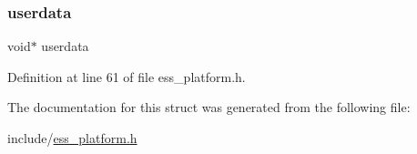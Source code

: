 \subsubsection{\texorpdfstring{userdata}{userdata}}
{\footnotesize\ttfamily void$\ast$ userdata}



Definition at line 61 of file ess\+\_\+platform.\+h.



The documentation for this struct was generated from the following file\+:\begin{DoxyCompactItemize}
\item 
include/\hyperlink{ess__platform_8h}{ess\+\_\+platform.\+h}\end{DoxyCompactItemize}
